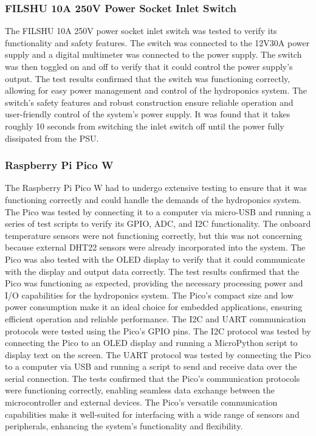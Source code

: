 \documentclass[12pt]{article} %
\begin{document}
\subsubsection{FILSHU 10A 250V Power Socket Inlet Switch}
\noindent The FILSHU 10A 250V power socket inlet switch was tested to verify its functionality and safety features. The switch was connected to the 12V30A power supply and a digital multimeter was connected to the power supply. The switch was then toggled on and off to verify that it could control the power supply's output. The test results confirmed that the switch was functioning correctly, allowing for easy power management and control of the hydroponics system. The switch's safety features and robust construction ensure reliable operation and user-friendly control of the system's power supply. It was found that it takes roughly 10 seconds from switching the inlet switch off until the power fully dissipated from the PSU.
\subsubsection{Raspberry Pi Pico W}
\noindent The Raspberry Pi Pico W \cite{ref_pico_w} had to undergo extensive testing to ensure that it was functioning correctly and could handle the demands of the hydroponics system. The Pico was tested by connecting it to a computer via micro-USB and running a series of test scripts to verify its GPIO, ADC, and I2C functionality. The onboard temperature sensors were not functioning correctly, but this was not concerning because external DHT22 sensors were already incorporated into the system. The Pico was also tested with the OLED display to verify that it could communicate with the display and output data correctly. The test results confirmed that the Pico was functioning as expected, providing the necessary processing power and I/O capabilities for the hydroponics system. The Pico's compact size and low power consumption make it an ideal choice for embedded applications, ensuring efficient operation and reliable performance.
\newline
\newline
\noindent The I2C and UART communication protocols were tested using the Pico's GPIO pins. The I2C protocol was tested by connecting the Pico to an OLED display and running a MicroPython script to display text on the screen. The UART protocol was tested by connecting the Pico to a computer via USB and running a script to send and receive data over the serial connection. The tests confirmed that the Pico's communication protocols were functioning correctly, enabling seamless data exchange between the microcontroller and external devices. The Pico's versatile communication capabilities make it well-suited for interfacing with a wide range of sensors and peripherals, enhancing the system's functionality and flexibility.
\end{document}
